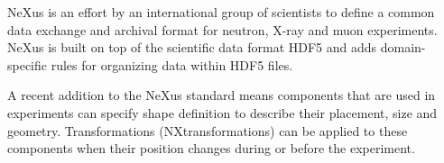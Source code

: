 NeXus is an effort by an international group of scientists to define a common data exchange and archival format for neutron, X-ray and muon experiments. NeXus is built on top of the scientific data format HDF5 and adds domain-specific rules for organizing data within HDF5 files.

\vspace{20pt}

\DTsetlength{10pt}{35pt}{5pt}{2pt}{7pt}




A recent addition to the NeXus standard means components that are used in experiments can specify shape definition to describe their placement, size and geometry. Transformations (NXtransformations) can be applied to these components when their position changes during or before the experiment. 
